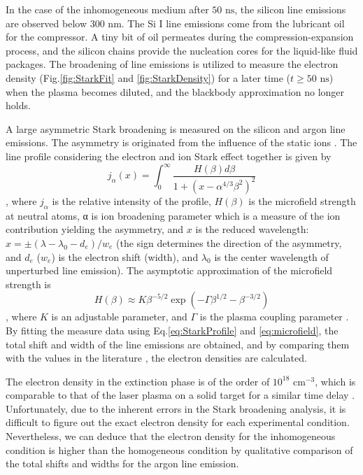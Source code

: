 In the case of the inhomogeneous medium after $50 \text{ ns}$, the silicon line emissions are observed below $300 \text{ nm}$. The Si I line emissions come from the lubricant oil for the compressor. A tiny bit of oil permeates during the compression-expansion process, and the silicon chains provide the nucleation cores for the liquid-like fluid packages. The broadening of line emissions is utilized to measure the electron density (Fig.\ref{fig:StarkFit} and \ref{fig:StarkDensity}) for a later time ($t\geq50 \text{ ns}$) when the plasma becomes diluted, and the blackbody approximation no longer holds.

A large asymmetric Stark broadening is measured on the silicon and argon line emissions. The asymmetry is originated from the influence of the static ions \cite{bengoechea2005asymmetric}. The line profile considering the electron and ion Stark effect together is given by \cite{griem2012spectral, bengoechea2005asymmetric}
\begin{equation}
j_{\alpha} \left( x \right) = \int_{0}^{\infty} \frac{H \left( \beta \right) d \beta}{1+\left( x-\alpha^{4 / 3} \beta^{2} \right)^{2}}
\label{eq:StarkProfile}
\end{equation}
, where $j_\alpha$ is the relative intensity of the profile, $H \left( \beta \right)$ is the microfield strength at neutral atoms, α is ion broadening parameter which is a measure of the ion contribution yielding the asymmetry, and $x$ is the reduced wavelength: $x=\pm \left( \lambda - \lambda_0 - d_e \right) / w_e$ (the sign determines the direction of the asymmetry, and $d_e$ ($w_e$) is the electron shift (width), and $\lambda_0$ is the center wavelength of unperturbed line emission). The asymptotic approximation of the microfield strength is 
\begin{equation}
H \left( \beta \right) \approx K \beta^{-5 / 2} \exp \left( -\Gamma \beta^{1 / 2}-\beta^{-3 / 2} \right)
\label{eq:microfield}
\end{equation}
, where $K$ is an adjustable parameter, and $\Gamma$ is the plasma coupling parameter \cite{potekhin2002electric}. By fitting the measure data using Eq.\ref{eq:StarkProfile} and \ref{eq:microfield}, the total shift and width of the line emissions are obtained, and by comparing them with the values in the literature \cite{konjevic2002experimental}, the electron densities are calculated.

The electron density in the extinction phase is of the order of $10^{18} \text{ cm}^{-3}$, which is comparable to that of the laser plasma on a solid target for a similar time delay \cite{ivkovic2017stark}. Unfortunately, due to the inherent errors in the Stark broadening analysis, it is difficult to figure out the exact electron density for each experimental condition. Nevertheless, we can deduce that the electron density for the inhomogeneous condition is higher than the homogeneous condition by qualitative comparison of the total shifts and widths for the argon line emission.



